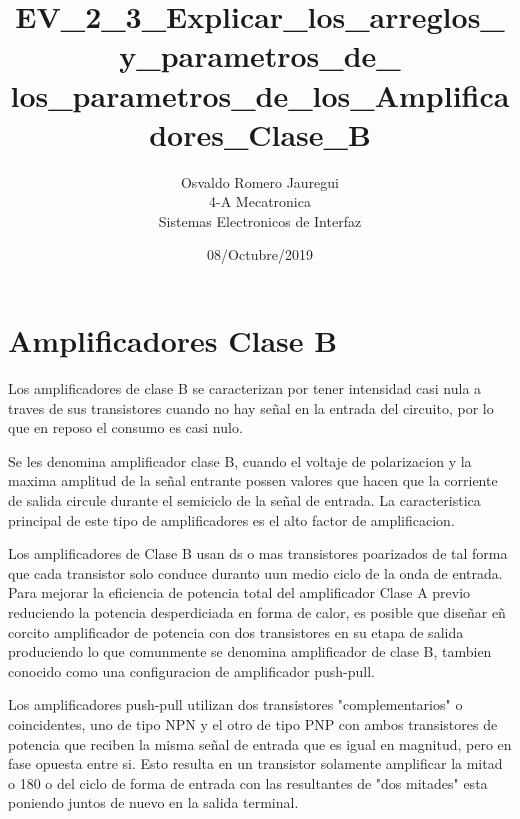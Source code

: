 \documentclass[12pt]{article}
\title{\textbf{EV\_2\_3\_Explicar\_los\_arreglos\_y\_parametros\_de\_
los\_parametros\_de\_los\_Amplificadores\_Clase\_B}}
\author{Osvaldo Romero Jauregui\\
		4-A Mecatronica\\
		Sistemas Electronicos de Interfaz}
\date{08/Octubre/2019}
\begin{document}
\maketitle

\section{Amplificadores Clase B}

Los amplificadores de clase B se caracterizan por tener intensidad casi nula a traves de sus transistores cuando no hay señal en la entrada del circuito, por lo que en reposo el consumo es casi nulo.

Se les denomina amplificador clase B, cuando el voltaje de polarizacion y la maxima amplitud de la señal entrante possen valores que hacen que la corriente de salida circule durante el semiciclo de la señal de entrada. La caracteristica principal de este tipo de amplificadores es el alto factor de amplificacion.

Los amplificadores de Clase B usan ds o mas transistores poarizados de tal forma que cada transistor solo conduce duranto uun medio ciclo de la onda de entrada.
Para mejorar la eficiencia de potencia total del amplificador Clase A previo reduciendo la potencia desperdiciada en forma de calor, es posible que diseñar eñ corcito amplificador de potencia con dos transistores en su etapa de salida produciendo lo que comunmente se denomina amplificador de clase B, tambien conocido como una configuracion de amplificador push-pull.

Los amplificadores push-pull utilizan dos transistores "complementarios" o coincidentes, uno de tipo NPN y el otro de tipo PNP con ambos transistores de potencia que reciben la misma señal de entrada que es igual en magnitud, pero en fase opuesta entre si. Esto resulta en un transistor solamente amplificar la mitad o 180 o del ciclo de forma de entrada con las resultantes de "dos mitades" esta poniendo juntos de nuevo en la salida terminal.
\end{document}
